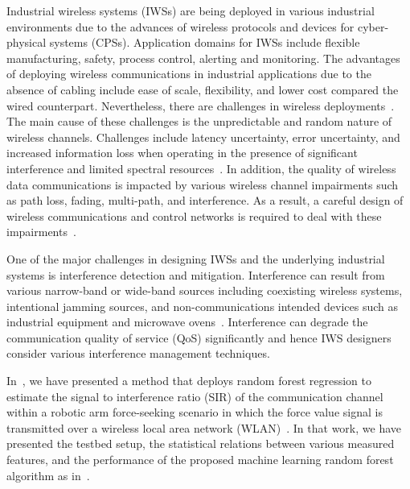 	Industrial wireless systems (IWSs) are being deployed in various industrial environments due to the advances of wireless protocols and devices for cyber-physical systems (CPSs). Application domains for IWSs include flexible manufacturing, safety, process control, alerting and monitoring\cite{Candell2018.IWSGuide}. The advantages of deploying wireless communications in industrial applications due to the absence of cabling include ease of scale, flexibility, and lower cost compared the wired counterpart. Nevertheless, there are challenges in wireless deployments~\cite{Sisinni2018,Bello2017,Pang2017.WirelessChallenges}. The main cause of these challenges is the unpredictable and random nature of wireless channels. Challenges include latency uncertainty, error uncertainty, and  increased information loss when operating in the presence of significant interference and limited spectral resources~\cite{Candell2017.SAS.IWSWorkshopReport}. In addition, the quality of wireless data communications is impacted by various wireless channel impairments such as path loss, fading, multi-path, and interference. As a result, a careful design of wireless communications and control networks is required to deal with these impairments~\cite{Lu2016.WirelessCPS,Kim2017.WirelessCodesign}.    
    
    One of the major challenges in designing IWSs and the underlying industrial systems is interference detection and mitigation. Interference can result from various narrow-band or wide-band sources including  coexisting wireless systems, intentional jamming sources, and non-communications intended devices such as industrial equipment and microwave ovens~\cite{Chiwewe2015.Survey.CR.Intf}. Interference can degrade the communication quality of service (QoS) significantly and hence IWS designers consider various interference management techniques.   

    In~\cite{Candell_ISIT_2019}, we have presented a method that deploys random forest regression to estimate the signal to interference ratio (SIR) of the communication channel within a robotic arm force-seeking scenario in which the force value signal is transmitted over a wireless local area network (WLAN)~\cite{IEEE802.11ac}. In that work, we have presented the testbed setup, the statistical relations between various measured features, and the performance of the proposed machine learning random forest algorithm as in~\cite{Candell_ISIT_2019}.  
    
